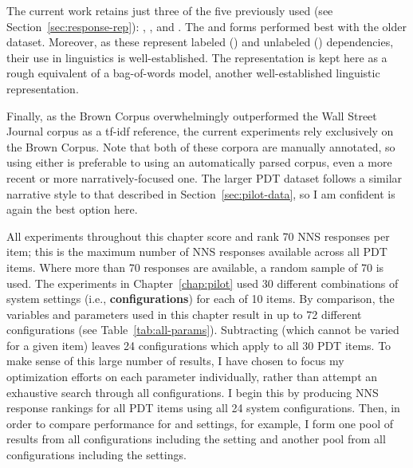The current work retains just three of the five  previously used (see Section~\ref{sec:response-rep}): , , and . The  and  forms performed best with the older dataset. Moreover, as these represent labeled () and unlabeled () dependencies, their use in linguistics is well-established. The  representation is kept here as a rough equivalent of a bag-of-words model, another well-established linguistic representation.

Finally, as the Brown Corpus overwhelmingly outperformed the Wall Street Journal corpus as a tf-idf reference, the current experiments rely exclusively on the Brown Corpus. Note that both of these corpora are manually annotated, so using either is preferable to using an automatically parsed corpus, even a more recent or more narratively-focused one. The larger PDT dataset follows a similar narrative style to that described in Section~\ref{sec:pilot-data}, so I am confident  is again the best option here.

All experiments throughout this chapter score and rank 70 NNS responses per item; this is the maximum number of NNS responses available across all PDT items. Where more than 70 responses are available, a random sample of 70 is used.
The experiments in Chapter~\ref{chap:pilot} used 30 different combinations of system settings (i.e., \textbf{configurations}) for each of 10 items. By comparison, the variables and parameters used in this chapter result in up to 72 different configurations (see Table~\ref{tab:all-params}). Subtracting  (which cannot be varied for a given item) leaves 24 configurations which apply to all 30 PDT items. To make sense of this large number of results, I have chosen to focus my optimization efforts on each parameter individually, rather than attempt an exhaustive search through all configurations. I begin this by producing NNS response rankings for all PDT items using all 24 system configurations. Then, in order to compare performance for  and  settings, for example, I form one pool of results from all configurations including the  setting and another pool from all configurations including the  settings.


